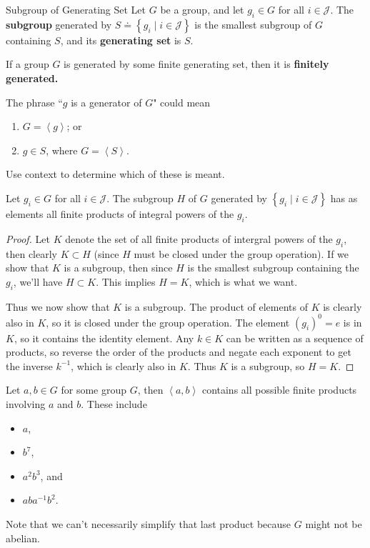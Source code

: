 \documentclass[10pt]{report}
\begin{document}
\begin{defn}{Subgroup of Generating Set}{}
	Let $G$ be a group, and let $g_i \in G$ for all $i \in \mathcal{J}$. The \textbf{subgroup} generated by $S \doteq \left\{ g_i \;|\; i \in \mathcal{J} \right\}$ is the smallest subgroup of $G$ containing $S$, and its \textbf{generating set} is $S$.

If  a group $G$ is generated by some finite generating set, then it is \textbf{finitely generated.} 
\end{defn}

\begin{note}{}{}
The phrase ``$g$ is a generator of $G$" could mean
\begin{enumerate}
	\item $G = \left\langle g \right\rangle$; or
	\item $g \in S$, where $G = \left\langle S \right\rangle$.
\end{enumerate}
Use context to determine which of these is meant.
\end{note}

\begin{thrm}{}{}
	Let $g_i \in G$ for all $i \in \mathcal{J}$. The subgroup $H$ of $G$ generated by $\left\{ g_i \;|\; i \in \mathcal{J} \right\}$ has as elements all finite products of integral powers of the $g_i$.
\end{thrm}
\begin{proof}
	Let $K$ denote the set of all finite products of intergral powers of the $g_i$, then clearly $K \subset H$ (since $H$ must be closed under the group operation). If we show that $K$ is a subgroup, then since $H$ is the smallest subgroup containing the $g_i$, we'll have $H \subset K$. This implies $H=K$, which is what we want.

	Thus we now show that $K$ is a subgroup. The product of elements of $K$ is clearly also in $K$, so it is closed under the group operation. The element $(g_i)^0 = e$ is in $K$, so it contains the identity element. Any $k \in K$ can be written as a sequence of products, so reverse the order of the products and negate each exponent to get the inverse $k^{-1}$, which is clearly also in $K$. Thus $K$ is a subgroup, so $H=K$.
\end{proof}

\begin{ex}{}{}
	Let $a,b \in G$ for some group $G$, then $\left\langle a,b \right\rangle$ contains all possible finite products involving $a$ and $b$. These include
	\begin{itemize}
		\item $a$,
		\item $b^7$,
		\item $a^2 b^3$, and
		\item $a b a^{-1} b^2$.
	\end{itemize}
	Note that we can't necessarily simplify that last product because $G$ might not be abelian.
\end{ex}
\end{document}
